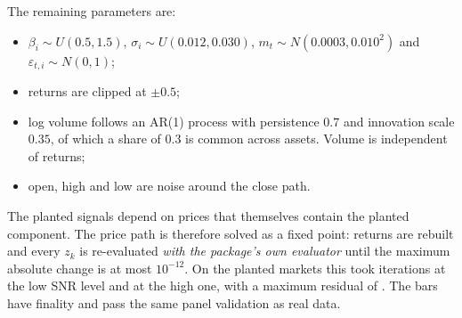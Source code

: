 The remaining parameters are:
\begin{itemize}
  \item $\beta_i\sim U(0.5,1.5)$, $\sigma_i\sim U(0.012,0.030)$,
    $m_t\sim N(0.0003,0.010^2)$ and $\varepsilon_{t,i}\sim N(0,1)$;
  \item returns are clipped at $\pm0.5$;
  \item log volume follows an AR(1) process with persistence $0.7$ and
    innovation scale $0.35$, of which a share of $0.3$ is common across
    assets. Volume is independent of returns;
  \item open, high and low are noise around the close path.
\end{itemize}
The planted signals depend on prices that themselves contain the planted
component. The price path is therefore solved as a fixed point: returns are
rebuilt and every $z_k$ is re-evaluated \emph{with the package's own
evaluator} until the maximum absolute change is at most $10^{-12}$. On the
planted markets this took
\SynIterationsLow{} iterations at the low SNR level and \SynIterationsHigh{}
at the high one, with a maximum residual of \SynMaxResidual{}. The bars have finality  and pass the
same panel validation as real data.

